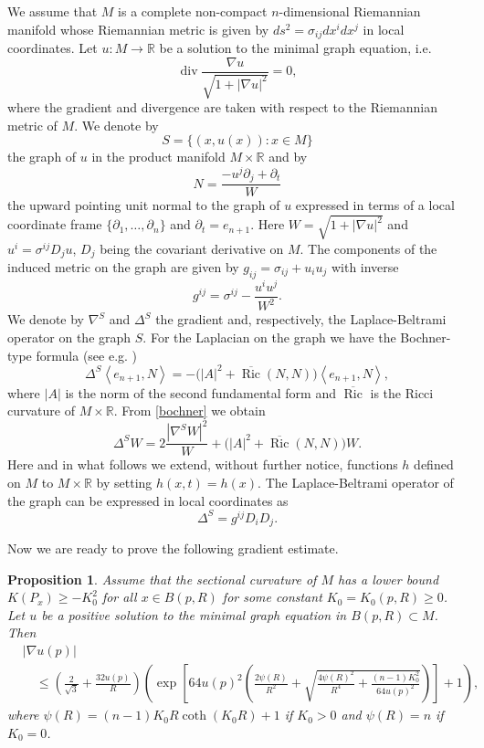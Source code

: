 \documentclass[10pt,a4paper,reqno]{amsart}
\newcommand{\R}{\mathbb{R}}
\newcommand{\ang}[1]{\left\langle #1 \right\rangle}
\newcommand{\p}{\partial}
\DeclareMathOperator\dv{div}
\DeclareMathOperator\Ric{Ric}
\numberwithin{equation}{section}
\theoremstyle{plain}
\newtheorem{prop}[thm]{Proposition}
\theoremstyle{definition}
\begin{document}
We assume that $M$ is a complete non-compact $n$-dimensional Riemannian manifold whose Riemannian metric is given by
$ds^2=\sigma_{ij}dx^i dx^j$ in local coordinates.
Let $u\colon M \to \R$ be a solution to the minimal graph equation, i.e.
    \[
      \dv \frac{\nabla u}{\sqrt{1+|\nabla u|^2}} = 0,
    \]
where the gradient and divergence are taken with respect to the Riemannian metric of $M$. We denote by
    \[
      S=\big\{(x,u(x)) \colon x \in M\big\}
    \]
the graph of $u$ in the product manifold $M\times\R$ and by 
\begin{equation*}\label{unitnorm}
      N= \frac{-u^j\p_j + \p_t}{W}
    \end{equation*}
the upward pointing unit normal to the graph of $u$ expressed in terms of a local coordinate frame $\{\partial_1,\ldots,\partial_n\}$ and 
$\partial_t=e_{n+1}$. Here $W = \sqrt{1+|\nabla u|^2}$ and $u^i = \sigma^{ij} D_j u$, $D_j$ being the covariant derivative on $M$.
The components of the induced metric on the graph are given by $g_{ij}=\sigma_{ij} + u_i u_j$ with inverse     
\begin{equation*}
      g^{ij} = \sigma^{ij} - \frac{u^i u^j}{W^2}.
    \end{equation*}
We denote by $\nabla^S$ and $\Delta^S$ the gradient and, respectively, the Laplace-Beltrami operator on the graph $S$. 
For the Laplacian on the graph we have the Bochner-type
formula (see e.g. \cite{fornari})
     \begin{equation}\label{bochner}
      \Delta^S\ang{e_{n+1},N} = -\big( |A|^2 + \overline{\Ric}(N,N) \big)\ang{e_{n+1},N},
     \end{equation}
where $|A|$ is the norm of the second fundamental form and $\overline{\Ric}$ is the Ricci curvature of $M\times\R$. 
From \eqref{bochner} we obtain
      \begin{equation}\label{bochW}
       \Delta^S W = 2 \frac{|\nabla^S W|^2}{W} + \big( |A|^2 + \overline{\Ric}(N,N) \big) W.
      \end{equation}
Here and in what follows we extend, without further notice, functions $h$ defined on $M$ to $M\times\R$ by setting $h(x,t)=h(x)$.
The Laplace-Beltrami operator of the graph can be expressed in local coordinates as
    \[
      \Delta^S = g^{ij}D_i D_j.
    \]
   
Now we are ready to prove the following gradient estimate.
  \begin{prop}\label{gradest}
Assume that the sectional curvature of $M$ 
has a lower bound $K(P_x)\ge -K_0^2$ for all $x\in B(p,R) $ for some constant $K_0=K_0(p,R)\ge 0$.
Let $u$ be a positive solution to the minimal graph equation in $B(p,R) \subset M$. Then 
      \begin{align}\label{loc-grad-est}
       & |\nabla u(p)| \\
       &\quad \le \left(\frac{2}{\sqrt{3}}+\frac{32 u(p)}{R}\right)
       \left( \exp\left[64 u(p)^2 \left( \frac{2\psi(R)}{R^2}+\sqrt{\frac{4\psi(R)^2}{R^4} 
       + \frac{(n-1)K_0^2}{64 u(p)^2}} \right)\right] + 1\right),\nonumber
             \end{align}
    where $\psi(R) = (n-1)K_0 R \coth(K_0R) + 1$ if $K_0>0$ and $\psi(R)=n$ if $K_0=0$. 
  \end{prop}
\end{document}
